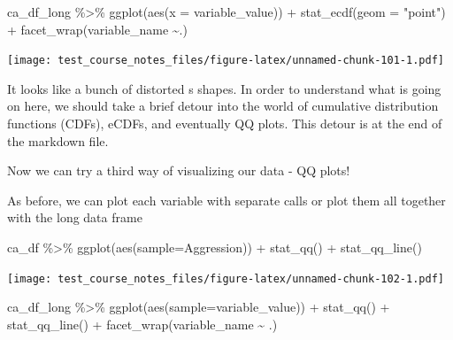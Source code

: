 \documentclass[
]{book}
\newenvironment{Shaded}{\begin{snugshade}}{\end{snugshade}}
\newcommand{\AttributeTok}[1]{\textcolor[rgb]{0.77,0.63,0.00}{#1}}
\newcommand{\FunctionTok}[1]{\textcolor[rgb]{0.00,0.00,0.00}{#1}}
\newcommand{\NormalTok}[1]{#1}
\newcommand{\SpecialCharTok}[1]{\textcolor[rgb]{0.00,0.00,0.00}{#1}}
\newcommand{\StringTok}[1]{\textcolor[rgb]{0.31,0.60,0.02}{#1}}
\begin{document}
\begin{Shaded}
\begin{Highlighting}[]
\NormalTok{ca\_df\_long }\SpecialCharTok{\%\textgreater{}\%} 
  \FunctionTok{ggplot}\NormalTok{(}\FunctionTok{aes}\NormalTok{(}\AttributeTok{x =}\NormalTok{ variable\_value)) }\SpecialCharTok{+}
  \FunctionTok{stat\_ecdf}\NormalTok{(}\AttributeTok{geom =} \StringTok{"point"}\NormalTok{) }\SpecialCharTok{+}
  \FunctionTok{facet\_wrap}\NormalTok{(variable\_name }\SpecialCharTok{\textasciitilde{}}\NormalTok{.) }
\end{Highlighting}
\end{Shaded}

\texttt{[image: test\_course\_notes\_files/figure-latex/unnamed-chunk-101-1.pdf]}

It looks like a bunch of distorted s shapes. In order to understand what is going on here, we should take a brief detour into the world of cumulative distribution functions (CDFs), eCDFs, and eventually QQ plots. This detour is at the end of the markdown file.

Now we can try a third way of visualizing our data - QQ plots!

As before, we can plot each variable with separate calls or plot them all together with the long data frame

\begin{Shaded}
\begin{Highlighting}[]
\NormalTok{ca\_df }\SpecialCharTok{\%\textgreater{}\%} 
  \FunctionTok{ggplot}\NormalTok{(}\FunctionTok{aes}\NormalTok{(}\AttributeTok{sample=}\NormalTok{Aggression)) }\SpecialCharTok{+}
  \FunctionTok{stat\_qq}\NormalTok{() }\SpecialCharTok{+}
  \FunctionTok{stat\_qq\_line}\NormalTok{()}
\end{Highlighting}
\end{Shaded}

\texttt{[image: test\_course\_notes\_files/figure-latex/unnamed-chunk-102-1.pdf]}

\begin{Shaded}
\begin{Highlighting}[]
\NormalTok{ca\_df\_long }\SpecialCharTok{\%\textgreater{}\%} 
  \FunctionTok{ggplot}\NormalTok{(}\FunctionTok{aes}\NormalTok{(}\AttributeTok{sample=}\NormalTok{variable\_value)) }\SpecialCharTok{+}
  \FunctionTok{stat\_qq}\NormalTok{() }\SpecialCharTok{+}
  \FunctionTok{stat\_qq\_line}\NormalTok{() }\SpecialCharTok{+}
  \FunctionTok{facet\_wrap}\NormalTok{(variable\_name }\SpecialCharTok{\textasciitilde{}}\NormalTok{ .)}
\end{Highlighting}
\end{Shaded}
\end{document}
